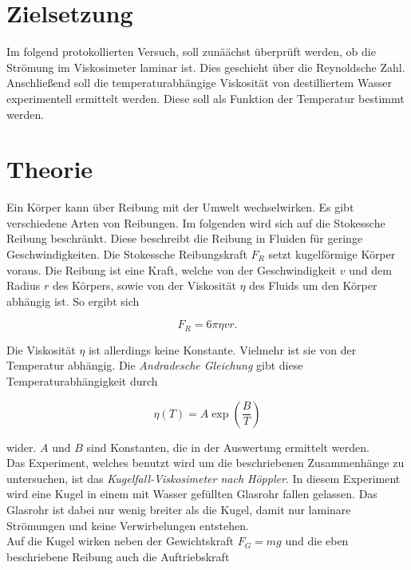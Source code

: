 


\section{Zielsetzung}
\label{sec:Theorie}
Im folgend protokollierten Versuch, soll zunäächst überprüft werden, ob die Strömung im Viskosimeter laminar ist. Dies geschieht 
über die Reynoldsche Zahl.
Anschließend soll die temperaturabhängige Viskosität von destilliertem Wasser experimentell ermittelt werden. Diese soll als 
Funktion der Temperatur bestimmt werden.

\section{Theorie}
Ein Körper kann über Reibung mit der Umwelt wechselwirken. Es gibt verschiedene Arten von Reibungen. Im folgenden wird sich auf die 
Stokessche Reibung beschränkt. Diese beschreibt die Reibung in Fluiden für geringe Geschwindigkeiten. Die Stokessche Reibungskraft 
$F_R$ setzt kugelförmige Körper voraus.
Die Reibung ist eine Kraft, welche von der Geschwindigkeit $v$ und dem Radius $r$ des Körpers, sowie von der Viskosität $\eta$ des 
Fluids um den Körper abhängig ist. So ergibt sich

\begin{equation*}
    F_R = 6 \pi \eta v r.
\end{equation*}

\noindent
Die Viskosität $\eta$ ist allerdings keine Konstante. Vielmehr ist sie von der Temperatur abhängig. Die \emph{Andradesche Gleichung} 
gibt diese Temperaturabhängigkeit durch 

\begin{equation*}
    \eta(T) = A \exp\left({\frac{B}{T}}\right)
\end{equation*}

\noindent
wider.
$A$ und $B$ sind Konstanten, die in der Auswertung ermittelt werden.\\

\noindent
Das Experiment, welches benutzt wird um die beschriebenen Zusammenhänge zu untersuchen, ist das \emph{Kugelfall-Viskosimeter nach Höppler}.
In diesem Experiment wird eine Kugel in einem mit Wasser gefüllten Glasrohr fallen gelassen. Das Glasrohr ist dabei nur wenig breiter als 
die Kugel, damit nur laminare Strömungen und keine Verwirbelungen entstehen.\\
Auf die Kugel wirken neben der Gewichtskraft $F_G = m g$ und die eben beschriebene Reibung auch die Auftriebskraft 

